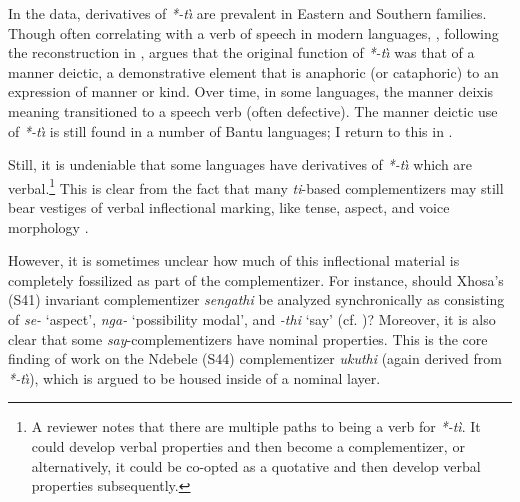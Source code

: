 \documentclass[output=paper,colorlinks,citecolor=brown,
]{langscibook}
\begin{document}
In the data, derivatives of \textit{*-t\`\i} are prevalent in Eastern and Southern families. Though often correlating with a verb of speech in modern languages, \citet{Guldemann:2002, Guldemann:2008}, following the reconstruction in \citet[105]{Guthrie:1970}, argues that the original function of \textit{*-t\`\i} was that of a manner deictic, a demonstrative element that is anaphoric (or cataphoric) to an expression of manner or kind.  Over time, in some languages, the manner deixis meaning transitioned to a speech verb (often defective). The manner deictic use of \textit{*-t\`\i} is still found in a number of Bantu languages;  I return to  this in .
%
%
%
%

Still, it is undeniable that some languages have derivatives of \textit{*-t\`\i} which are verbal.\footnote{A reviewer notes that there are multiple paths to being a verb for \textit{*-t\`i}. It could develop verbal properties and then become a complementizer, or alternatively, it could be co-opted as a quotative and then develop verbal properties subsequently.} This is clear from the fact that many \textit{ti}-based complementizers may still bear vestiges of verbal inflectional marking, like tense, aspect, and voice morphology \citep{Persohn:2017, LetsholoSafir:2019, Dembetembe:1976}.

However, it is sometimes unclear how much of this inflectional material is completely fossilized as part of the complementizer. For instance, should Xhosa's (S41) invariant complementizer \textit{sengathi} be analyzed synchronically as consisting of \textit{se-} `aspect', \textit{nga-} `possibility modal', and \textit{-thi} `say' (cf. \citealt[33]{Halpert:2019})? Moreover, it is also clear that some \textit{say}-complementizers have nominal properties. This is the core finding  of  work on the Ndebele (S44) complementizer \textit{ukuthi} (again derived from \textit{*-t\`\i}), which is argued to be housed inside of a nominal layer. 
\end{document}
